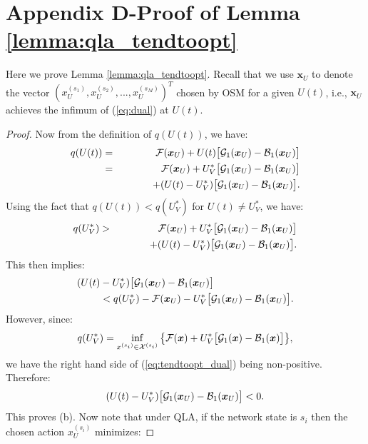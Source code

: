 \documentclass[journal]{IEEEtran}
\newcommand{\bv}[1]{{\boldsymbol{#1} }}
\newcommand{\script}[1]{{{\cal{#1} }}}
\begin{document}
\section*{Appendix D-Proof of Lemma \ref{lemma:qla_tendtoopt}}%
Here we prove Lemma \ref{lemma:qla_tendtoopt}. Recall that we use $\bv{x}_U$ to denote the vector $(x_{U}^{(s_1)}, x_{U}^{(s_2)}, ..., x_{U}^{(s_M)})^T$ chosen by OSM for a given $U(t)$, i.e., $\bv{x}_{U}$ achieves the infimum of (\ref{eq:dual}) at $U(t)$.
\begin{proof}
Now from the definition of $q(U(t))$, we have: %
\begin{eqnarray}
q(U(t))&=&\script{F}(\bv{x}_U)+U(t)\big[\script{G}_1(\bv{x}_U)-\script{B}_1(\bv{x}_U)\big]\nonumber\\
&=&\script{F}(\bv{x}_U)+U^*_V\big[\script{G}_1(\bv{x}_U)-\script{B}_1(\bv{x}_U)\big]\label{eq:tendtoopt_step}\\
&&\qquad\quad+(U(t)-U_V^*)\big[\script{G}_1(\bv{x}_U)-\script{B}_1(\bv{x}_U)\big].\nonumber
\end{eqnarray}
Using the fact that $q(U(t))<q(U^*_V)$ for $U(t)\neq U^*_V$, we have:
\begin{eqnarray}
q(U^*_V)&>&\script{F}(\bv{x}_U)+U^*_V\big[\script{G}_1(\bv{x}_U)-\script{B}_1(\bv{x}_U)\big]\label{eq:tendtoopt_step}\\
&&\qquad\quad+(U(t)-U_V^*)\big[\script{G}_1(\bv{x}_U)-\script{B}_1(\bv{x}_U)\big].\nonumber
\end{eqnarray}
This then implies:
\begin{eqnarray}
(U(t)-U_V^*)\big[\script{G}_1(\bv{x}_U)-\script{B}_1(\bv{x}_U)\big]\label{eq:tendtoopt_dual}\qquad\qquad\qquad\qquad\\
 <q(U^*_V)-\script{F}(\bv{x}_U)-U^*_V\big[\script{G}_1(\bv{x}_U)-\script{B}_1(\bv{x}_U)\big].\nonumber
\end{eqnarray}
However,  since: 
\[q(U^*_V)=\inf_{x^{(s_i)}\in\script{X}^{(s_i)}}\big\{\script{F}(\bv{x})+U^*_V\big[\script{G}_1(\bv{x})-\script{B}_1(\bv{x})\big]\big\},\] 
we have the right hand side of (\ref{eq:tendtoopt_dual}) being non-positive. Therefore:
\begin{eqnarray}
(U(t)-U_V^*)\big[\script{G}_1(\bv{x}_U)-\script{B}_1(\bv{x}_U)\big]<0.\label{eq:tendtoopt_dual_neg}
\end{eqnarray}
This proves (b). Now note that  under QLA, if the network state is $s_i$ then the chosen action $x^{(s_i)}_{U}$ minimizes: 

\end{proof}
\end{document}
